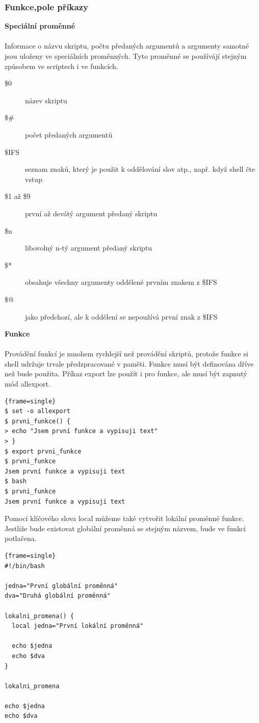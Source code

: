 \documentclass[a4paper,12pt]{article}
\newcommand{\nadpis}[1]{%
	\vspace{4 mm}
	\textbf{#1}\\
	\vspace{4 mm}
	}
\newenvironment{codeframe}{%
  \begin{Sbox} 
    \begin{minipage} 
      {\columnwidth-\leftmargin-\rightmargin-2\fboxsep-2\fboxrule-4pt} 
}{%

  \end{minipage} 
  \end{Sbox} 
  \begin{center} 
    \fcolorbox{black}{codeback}{\TheSbox} 
  \end{center} 
}
\begin{document}
\subsubsection{Funkce,pole příkazy}
\nadpis{Speciální proměnné}\\
Informace o názvu skriptu, počtu předaných argumentů a argumenty samotné jsou uloženy ve speciálních proměnných. Tyto proměnné se používájí stejným způsobem ve scriptech i ve funkcích\cite{ABC_SBASH}.
\begin{description}
 \item[\$0] název skriptu
 \item[\$\#] počet předaných argumentů
 \item[\$IFS] seznam znaků, který je použit k oddělování slov atp., např. když shell čte vstup
 \item[\$1 až \$9] první až devátý argument předaný skriptu
 \item[\${n}] libovolný n-tý argument předaný skriptu
 \item[\$*] obsahuje všechny argumenty oddělené prvním znakem z \$IFS
 \item[\$@] jako předchozí, ale k oddělení se nepoužívá první znak z \$IFS
 \end{description}
\nadpis{Funkce}\\
Provádění funkcí je mnohem rychlejší než provádění skriptů, protože funkce si shell udržuje trvale předzpracované v paměti. Funkce musí být 
definována dříve než bude použita. Příkaz export lze použít i pro funkce, ale musí být zapnutý mód allexport\cite{ABC_SBASH}.
    \begin{codeframe}
      \begin{Verbatim}{frame=single}
$ set -o allexport
$ prvni_funkce() {
> echo "Jsem první funkce a vypisuji text"
> }
$ export prvni_funkce
$ prvni_funkce
Jsem první funkce a vypisuji text
$ bash
$ prvni_funkce
Jsem první funkce a vypisuji text
\end{Verbatim} 
    \end{codeframe}
Pomocí klíčového slova local můžeme také vytvořit lokální proměnné funkce. Jestliže bude existovat globální proměnná se stejným názvem, bude ve funkci potlačena\cite{ABC_SBASH}.
    \begin{codeframe}
      \begin{Verbatim}{frame=single}
#!/bin/bash

jedna="První globální proměnná"
dva="Druhá globální proměnná"

lokalni_promena() {
  local jedna="První lokální proměnná"

  echo $jedna
  echo $dva
}

lokalni_promena

echo $jedna
echo $dva
\end{Verbatim} 
    \end{codeframe}
\end{document}
